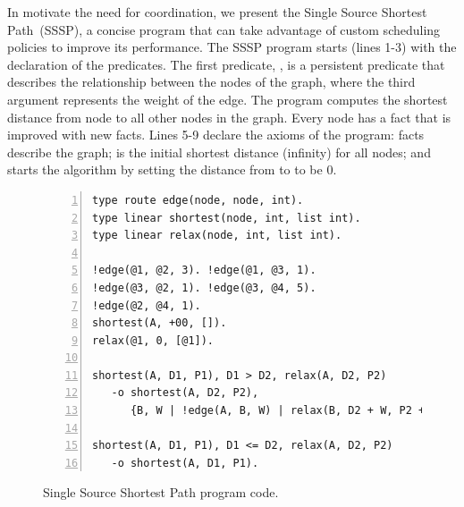 In motivate the need for coordination, we present the Single
Source Shortest Path~(SSSP), a concise program that can take advantage of custom
scheduling policies to improve its performance. The SSSP program starts (lines
1-3) with the declaration of the predicates. The first predicate, ,
is a persistent predicate that describes the relationship between the nodes of
the graph, where the third argument represents the weight of the edge.  The
program computes the shortest distance from node  to all other nodes
in the graph. Every node has a  fact that is improved with new
 facts.  Lines 5-9 declare the axioms of the program:
 facts describe the graph;  is the
initial shortest distance (infinity) for all nodes; and  starts the algorithm by setting the distance from  to
 to be 0.

\begin{figure}[ht]
\begin{Verbatim}[numbers=left,fontsize=\scriptsize]
type route edge(node, node, int).
type linear shortest(node, int, list int).
type linear relax(node, int, list int).

!edge(@1, @2, 3). !edge(@1, @3, 1).
!edge(@3, @2, 1). !edge(@3, @4, 5).
!edge(@2, @4, 1).
shortest(A, +00, []).
relax(@1, 0, [@1]).

shortest(A, D1, P1), D1 > D2, relax(A, D2, P2)
   -o shortest(A, D2, P2),
      {B, W | !edge(A, B, W) | relax(B, D2 + W, P2 ++ [B])}.

shortest(A, D1, P1), D1 <= D2, relax(A, D2, P2)
   -o shortest(A, D1, P1).
\end{Verbatim}
\caption{Single Source Shortest Path program code.}
\label{code:shortest_path_program}
\end{figure}

